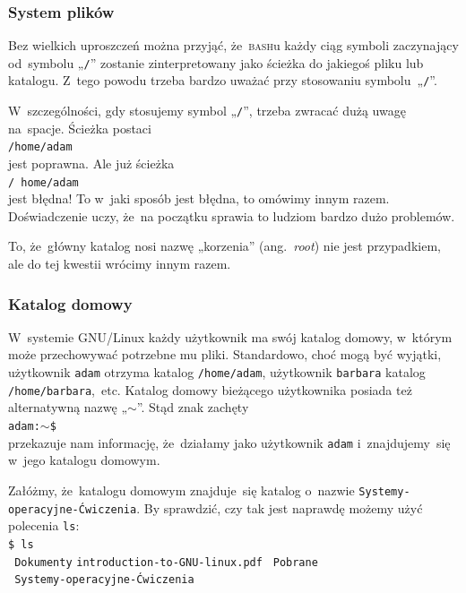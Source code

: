 \documentclass[10pt,t]{beamer}
\begin{document}
\begin{frame}
  \frametitle{System plików}


  Bez wielkich uproszczeń można przyjąć, że~\textsc{bash}u \alert{każdy}
  ciąg symboli zaczynający od~symbolu „\texttt{/}” zostanie zinterpretowany
  jako ścieżka do jakiegoś pliku lub katalogu. Z~tego powodu trzeba
  \alert{bardzo} uważać przy stosowaniu symbolu~„\texttt{/}”.

  W~szczególności, gdy stosujemy symbol „\texttt{/}”, trzeba zwracać dużą
  uwagę na~spacje. Ścieżka postaci \\
  \texttt{/home/adam} \\
  jest poprawna. Ale już ścieżka \\
  \texttt{/ home/adam} \\
  jest \alert{błędna}! To w~jaki sposób jest błędna, to omówimy innym
  razem. Doświadczenie uczy, że~na początku sprawia to ludziom
  bardzo dużo problemów.

  To, że~główny katalog nosi nazwę „korzenia” (ang.~\textit{root}) nie jest
  przypadkiem, ale do tej kwestii wrócimy innym razem.

\end{frame}





\begin{frame}
  \frametitle{Katalog domowy}


  W~systemie GNU/Linux każdy użytkownik ma swój katalog domowy, w~którym
  może przechowywać potrzebne mu pliki. Standardowo, choć mogą być wyjątki,
  użytkownik \texttt{adam} otrzyma katalog \texttt{/home/adam}, użytkownik
  \texttt{barbara} katalog \texttt{/home/barbara},~etc. Katalog domowy
  bieżącego użytkownika posiada też alternatywną nazwę „$\sim$”. Stąd znak
  zachęty \\
  \texttt{adam:$\sim$\$} \\
  przekazuje nam informację, że~działamy jako użytkownik \texttt{adam}
  i~znajdujemy~się w~jego katalogu domowym.

  Załóżmy, że~katalogu domowym znajduje~się katalog o~nazwie
  \texttt{Systemy-operacyjne-Ćwiczenia}. By sprawdzić, czy tak jest
  naprawdę możemy użyć polecenia \texttt{ls}: \\
  \texttt{\$ ls} \\
  \texttt{{\color{jAxisBlue} Dokumenty}} \quad
  \texttt{introduction-to-GNU-linux.pdf} \quad
  \texttt{{\color{jAxisBlue} Pobrane}} \\
  \texttt{{\color{jAxisBlue} Systemy-operacyjne-Ćwiczenia}} \\

\end{frame}
\end{document}
